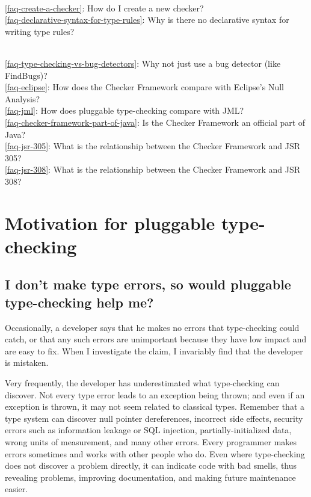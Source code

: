 \\ \ref{faq-create-a-checker}: How do I create a new checker?
\\ \ref{faq-declarative-syntax-for-type-rules}: Why is there no declarative syntax for writing type rules?

\\ \ref{faq-type-checking-vs-bug-detectors}: Why not just use a bug detector (like FindBugs)?
\\ \ref{faq-eclipse}: How does the Checker Framework compare with Eclipse's Null Analysis?
\\ \ref{faq-jml}: How does pluggable type-checking compare with JML?
\\ \ref{faq-checker-framework-part-of-java}: Is the Checker Framework an official part of Java?
\\ \ref{faq-jsr-305}: What is the relationship between the Checker Framework and JSR 305?
\\ \ref{faq-jsr-308}: What is the relationship between the Checker Framework and JSR 308?


\section{Motivation for pluggable type-checking\label{faq-motivation-section}}

\subsection{I don't make type errors, so would pluggable type-checking help me?\label{never-make-type-errors}}

Occasionally, a developer says that he makes no errors that type-checking
could catch, or that any such errors are unimportant because they have low
impact and are easy to fix.  When I investigate the claim, I invariably
find that the developer is mistaken.

Very frequently, the developer has underestimated what type-checking can
discover.  Not every type error leads to an exception being thrown; and
even if an exception is thrown, it may not seem related to classical types.
Remember that a type system can discover
null pointer dereferences,
incorrect side effects,
security errors such as information leakage or SQL injection,
partially-initialized data,
wrong units of measurement,
and many other errors.
Every programmer makes errors sometimes and works with other people
who do.
Even where type-checking does not discover a
problem directly, it can indicate code with bad smells, thus revealing
problems, improving documentation, and making future maintenance easier.

